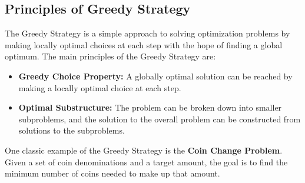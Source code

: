 \documentclass[12pt]{book} %
\begin{document}
\subsection{Principles of Greedy Strategy}
The Greedy Strategy is a simple approach to solving optimization problems by making locally optimal choices at each step with the hope of finding a global optimum. The main principles of the Greedy Strategy are:

\begin{itemize}
    \item \textbf{Greedy Choice Property:} A globally optimal solution can be reached by making a locally optimal choice at each step.
    \item \textbf{Optimal Substructure:} The problem can be broken down into smaller subproblems, and the solution to the overall problem can be constructed from solutions to the subproblems.
\end{itemize}

One classic example of the Greedy Strategy is the \textbf{Coin Change Problem}. Given a set of coin denominations and a target amount, the goal is to find the minimum number of coins needed to make up that amount.
\end{document}

